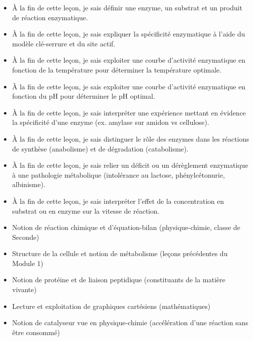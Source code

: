 \documentclass[11pt]{article}
\begin{document}
\begin{objectifs}
\begin{itemize}
\item À la fin de cette leçon, je sais définir une enzyme, un substrat et un produit de réaction enzymatique.
\item À la fin de cette leçon, je sais expliquer la spécificité enzymatique à l'aide du modèle clé-serrure et du site actif.
\item À la fin de cette leçon, je sais exploiter une courbe d'activité enzymatique en fonction de la température pour déterminer la température optimale.
\item À la fin de cette leçon, je sais exploiter une courbe d'activité enzymatique en fonction du pH pour déterminer le pH optimal.
\item À la fin de cette leçon, je sais interpréter une expérience mettant en évidence la spécificité d'une enzyme (ex. amylase sur amidon vs cellulose).
\item À la fin de cette leçon, je sais distinguer le rôle des enzymes dans les réactions de synthèse (anabolisme) et de dégradation (catabolisme).
\item À la fin de cette leçon, je sais relier un déficit ou un dérèglement enzymatique à une pathologie métabolique (intolérance au lactose, phénylcétonurie, albinisme).
\item À la fin de cette leçon, je sais interpréter l'effet de la concentration en substrat ou en enzyme sur la vitesse de réaction.
\end{itemize}
\end{objectifs}

\begin{prerequis}
\begin{itemize}
\item Notion de réaction chimique et d'équation-bilan (physique-chimie, classe de Seconde)
\item Structure de la cellule et notion de métabolisme (leçons précédentes du Module 1)
\item Notion de protéine et de liaison peptidique (constituants de la matière vivante)
\item Lecture et exploitation de graphiques cartésiens (mathématiques)
\item Notion de catalyseur vue en physique-chimie (accélération d'une réaction sans être consommé)
\end{itemize}
\end{prerequis}
\end{document}
